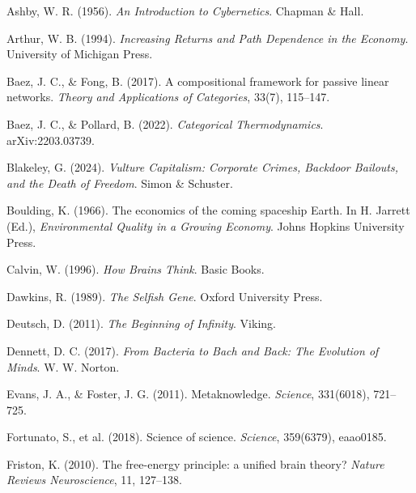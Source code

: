 \documentclass[11pt,a4paper,titlepage]{article}
\theoremstyle{definition}
\begin{document}
\begin{itemize}
\begin{thebibliography}{99}
Ashby, W. R. (1956).
\newblock \emph{An Introduction to Cybernetics}.
\newblock Chapman \& Hall.

Arthur, W. B. (1994).
\newblock \emph{Increasing Returns and Path Dependence in the Economy}.
\newblock University of Michigan Press.

Baez, J. C., \& Fong, B. (2017).
\newblock A compositional framework for passive linear networks.
\newblock \emph{Theory and Applications of Categories}, 33(7), 115–147.

Baez, J. C., \& Pollard, B. (2022).
\newblock \emph{Categorical Thermodynamics}.
\newblock arXiv:2203.03739.

Blakeley, G. (2024).
\newblock \emph{Vulture Capitalism: Corporate Crimes, Backdoor Bailouts, and the Death of Freedom}.
\newblock Simon \& Schuster.

Boulding, K. (1966).
\newblock The economics of the coming spaceship Earth.
\newblock In H. Jarrett (Ed.), \emph{Environmental Quality in a Growing Economy}.
\newblock Johns Hopkins University Press.

Calvin, W. (1996).
\newblock \emph{How Brains Think}.
\newblock Basic Books.

Dawkins, R. (1989).
\newblock \emph{The Selfish Gene}.
\newblock Oxford University Press.

Deutsch, D. (2011).
\newblock \emph{The Beginning of Infinity}.
\newblock Viking.

Dennett, D. C. (2017).
\newblock \emph{From Bacteria to Bach and Back: The Evolution of Minds}.
\newblock W. W. Norton.

Evans, J. A., \& Foster, J. G. (2011).
\newblock Metaknowledge.
\newblock \emph{Science}, 331(6018), 721–725.

Fortunato, S., et al. (2018).
\newblock Science of science.
\newblock \emph{Science}, 359(6379), eaao0185.

Friston, K. (2010).
\newblock The free-energy principle: a unified brain theory?
\newblock \emph{Nature Reviews Neuroscience}, 11, 127–138.


\end{thebibliography}
\end{itemize}
\end{document}
